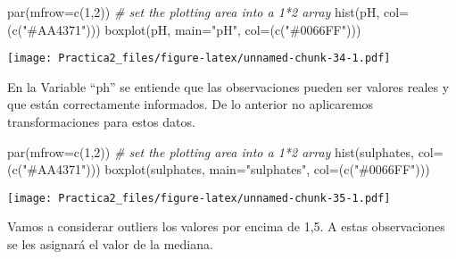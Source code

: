 \documentclass[
]{article}
\newenvironment{Shaded}{\begin{snugshade}}{\end{snugshade}}
\newcommand{\AttributeTok}[1]{\textcolor[rgb]{0.77,0.63,0.00}{#1}}
\newcommand{\CommentTok}[1]{\textcolor[rgb]{0.56,0.35,0.01}{\textit{#1}}}
\newcommand{\ConstantTok}[1]{\textcolor[rgb]{0.00,0.00,0.00}{#1}}
\newcommand{\DecValTok}[1]{\textcolor[rgb]{0.00,0.00,0.81}{#1}}
\newcommand{\FloatTok}[1]{\textcolor[rgb]{0.00,0.00,0.81}{#1}}
\newcommand{\FunctionTok}[1]{\textcolor[rgb]{0.00,0.00,0.00}{#1}}
\newcommand{\NormalTok}[1]{#1}
\newcommand{\OtherTok}[1]{\textcolor[rgb]{0.56,0.35,0.01}{#1}}
\newcommand{\SpecialCharTok}[1]{\textcolor[rgb]{0.00,0.00,0.00}{#1}}
\newcommand{\StringTok}[1]{\textcolor[rgb]{0.31,0.60,0.02}{#1}}
\begin{document}
\begin{Shaded}
\begin{Highlighting}[]
\FunctionTok{par}\NormalTok{(}\AttributeTok{mfrow=}\FunctionTok{c}\NormalTok{(}\DecValTok{1}\NormalTok{,}\DecValTok{2}\NormalTok{))    }\CommentTok{\# set the plotting area into a 1*2 array}
\FunctionTok{hist}\NormalTok{(pH, }\AttributeTok{col=}\NormalTok{(}\FunctionTok{c}\NormalTok{(}\StringTok{"\#AA4371"}\NormalTok{)))}
\FunctionTok{boxplot}\NormalTok{(pH, }\AttributeTok{main=}\StringTok{"pH"}\NormalTok{, }\AttributeTok{col=}\NormalTok{(}\FunctionTok{c}\NormalTok{(}\StringTok{"\#0066FF"}\NormalTok{)))}
\end{Highlighting}
\end{Shaded}

\texttt{[image: Practica2\_files/figure-latex/unnamed-chunk-34-1.pdf]}

En la Variable ``ph'' se entiende que las observaciones pueden ser
valores reales y que están correctamente informados. De lo anterior no
aplicaremos transformaciones para estos datos.

\begin{Shaded}
\begin{Highlighting}[]
\FunctionTok{par}\NormalTok{(}\AttributeTok{mfrow=}\FunctionTok{c}\NormalTok{(}\DecValTok{1}\NormalTok{,}\DecValTok{2}\NormalTok{))    }\CommentTok{\# set the plotting area into a 1*2 array}
\FunctionTok{hist}\NormalTok{(sulphates, }\AttributeTok{col=}\NormalTok{(}\FunctionTok{c}\NormalTok{(}\StringTok{"\#AA4371"}\NormalTok{)))}
\FunctionTok{boxplot}\NormalTok{(sulphates, }\AttributeTok{main=}\StringTok{"sulphates"}\NormalTok{, }\AttributeTok{col=}\NormalTok{(}\FunctionTok{c}\NormalTok{(}\StringTok{"\#0066FF"}\NormalTok{)))}
\end{Highlighting}
\end{Shaded}

\texttt{[image: Practica2\_files/figure-latex/unnamed-chunk-35-1.pdf]}

Vamos a considerar outliers los valores por encima de 1,5. A estas
observaciones se les asignará el valor de la mediana.

\begin{Shaded}
\end{Shaded}
\end{document}
